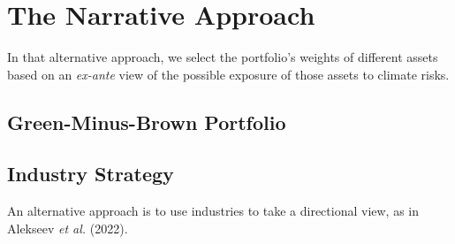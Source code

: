 \chapter{The Narrative Approach}

In that alternative approach, we select the portfolio's weights 
of different assets based on an \textit{ex-ante} view of the possible 
exposure of those assets to climate risks.

\section{Green-Minus-Brown Portfolio}

\section{Industry Strategy}

An alternative approach is to use industries to take a directional view, 
as in Alekseev \textit{et al.} (2022).